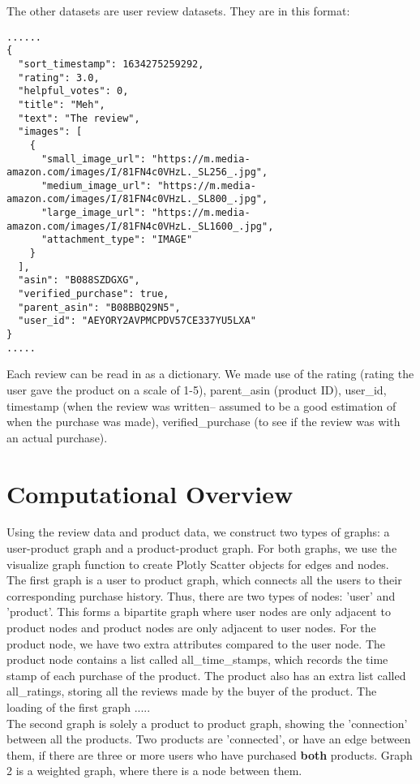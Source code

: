 \documentclass[fontsize=11pt]{article}
\begin{document}
\vspace{\baselineskip}
The other datasets are user review datasets. They are in this format:
\begin{verbatim}
......
{
  "sort_timestamp": 1634275259292,
  "rating": 3.0,
  "helpful_votes": 0,
  "title": "Meh",
  "text": "The review",
  "images": [
    {
      "small_image_url": "https://m.media-amazon.com/images/I/81FN4c0VHzL._SL256_.jpg",
      "medium_image_url": "https://m.media-amazon.com/images/I/81FN4c0VHzL._SL800_.jpg",
      "large_image_url": "https://m.media-amazon.com/images/I/81FN4c0VHzL._SL1600_.jpg",
      "attachment_type": "IMAGE"
    }
  ],
  "asin": "B088SZDGXG",
  "verified_purchase": true,
  "parent_asin": "B08BBQ29N5",
  "user_id": "AEYORY2AVPMCPDV57CE337YU5LXA"
}
.....
\end{verbatim}
Each review can be read in as a dictionary. We made use of the rating (rating the user gave the product on a scale of 1-5), parent\_asin (product ID), user\_id, timestamp (when the review was written-- assumed to be a good estimation of when the purchase was made), verified\_purchase (to see if the review was with an actual purchase).

\section*{Computational Overview}
Using the review data and product data, we construct two types of graphs: a user-product graph and a product-product graph. For both graphs, we use the visualize graph function to create Plotly Scatter objects for edges and nodes. \\
The first graph is a user to product graph, which connects all the users to their corresponding purchase history. Thus, there are two types of nodes: 'user' and 'product'. This forms a bipartite graph where user nodes are only adjacent to product nodes and product nodes are only adjacent to user nodes. For the product node, we have two extra attributes compared to the user node. The product node contains a list called all\_time\_stamps, which records the time stamp of each purchase of the product. The product also has an extra list called all\_ratings, storing all the reviews made by the buyer of the product. The loading of the first graph .....\\

The second graph is solely a product to product graph, showing the 'connection' between all the products. Two products are 'connected', or have an edge between them, if there are three or more users who have purchased \textbf{both} products. Graph 2 is a weighted graph, where there is a node between them.
\end{document}
